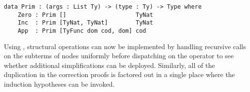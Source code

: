\begin{Verbatim}
data Prim : (args : List Ty) -> (type : Ty) -> Type where
    Zero : Prim []                    TyNat
    Inc  : Prim [TyNat, TyNat]        TyNat
    App  : Prim [TyFunc dom cod, dom] cod
\end{Verbatim}

Using , structural operations can now be implemented by handling recursive calls on the subterms of  nodes uniformly before dispatching on the operator to see whether additional simplifications can be deployed.
%
Similarly, all of the duplication in the correction proofs is factored out in a single place where the induction hypotheses can be invoked.

